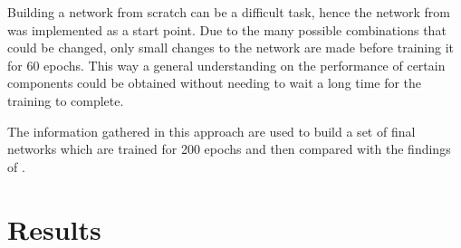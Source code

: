 \documentclass[
a4paper, 
12pt,
grayscalebody, %
abstract=on,
twoside, BCOR10mm, 12pt, DIV13,headinclude, footexclude, final, abstracton, openright
]{ibireprt}
\numberwithin{equation}{chapter}
\numberwithin{table}{chapter}
\numberwithin{figure}{chapter}
\numberwithin{algorithm}{chapter}
\numberwithin{example}{chapter}
\numberwithin{example}{chapter}
\begin{document}
Building a network from scratch can be a difficult task, hence the network from \cite{Walle2023} was implemented as a start point. Due to the many possible combinations that could be changed, only small changes to the network are made before training it for 60 epochs. This way a general understanding on the performance of certain components could be obtained without needing to wait a long time for the training to complete. 

The information gathered in this approach are used to build a set of final networks which are trained for 200 epochs and then compared with the findings of \cite{Walle2023}.












\chapter{Results}

\end{document}
